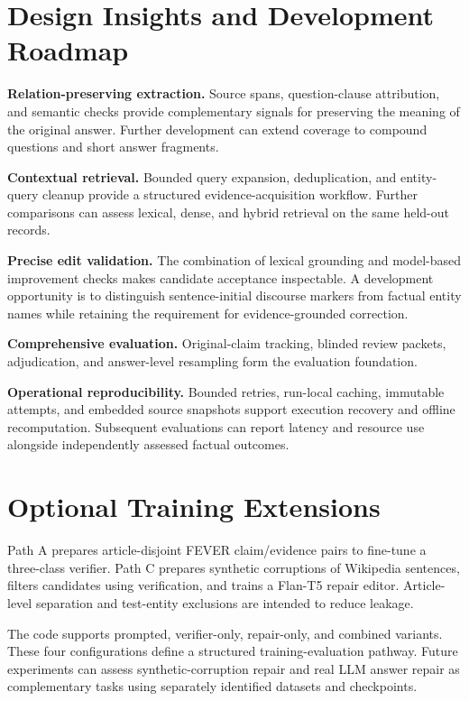 \documentclass[11pt,a4paper]{article}
\begin{document}
\section{Design Insights and Development Roadmap}
\textbf{Relation-preserving extraction.} Source spans, question-clause attribution, and semantic checks provide complementary signals for preserving the meaning of the original answer. Further development can extend coverage to compound questions and short answer fragments.

\textbf{Contextual retrieval.} Bounded query expansion, deduplication, and entity-query cleanup provide a structured evidence-acquisition workflow. Further comparisons can assess lexical, dense, and hybrid retrieval on the same held-out records.

\textbf{Precise edit validation.} The combination of lexical grounding and model-based improvement checks makes candidate acceptance inspectable. A development opportunity is to distinguish sentence-initial discourse markers from factual entity names while retaining the requirement for evidence-grounded correction.

\textbf{Comprehensive evaluation.} Original-claim tracking, blinded review packets, adjudication, and answer-level resampling form the evaluation foundation.

\textbf{Operational reproducibility.} Bounded retries, run-local caching, immutable attempts, and embedded source snapshots support execution recovery and offline recomputation. Subsequent evaluations can report latency and resource use alongside independently assessed factual outcomes.

\section{Optional Training Extensions}
Path A prepares article-disjoint FEVER claim/evidence pairs to fine-tune a three-class verifier. Path C prepares synthetic corruptions of Wikipedia sentences, filters candidates using verification, and trains a Flan-T5 repair editor. Article-level separation and test-entity exclusions are intended to reduce leakage.

The code supports prompted, verifier-only, repair-only, and combined variants. These four configurations define a structured training-evaluation pathway. Future experiments can assess synthetic-corruption repair and real LLM answer repair as complementary tasks using separately identified datasets and checkpoints.
\end{document}
